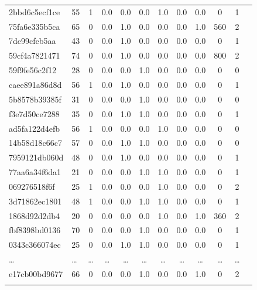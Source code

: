 \begin{landscape}
\begin{longtable}{p{3cm}lcccccccccc}
2bbd6c5ecf1ce & 55 & 1 & 0.0 & 0.0 & 0.0 & 1.0 & 0.0 & 0.0 & 0 & 1 \\
75fa6e335b5ca & 65 & 0 & 0.0 & 1.0 & 0.0 & 0.0 & 0.0 & 1.0 & 560 & 2 \\
7dc99cfcb5aa & 43 & 0 & 0.0 & 1.0 & 0.0 & 0.0 & 0.0 & 0.0 & 0 & 1 \\
59cf4a7821471 & 74 & 0 & 0.0 & 1.0 & 0.0 & 0.0 & 0.0 & 0.0 & 800 & 2 \\
59f9fe56c2f12 & 28 & 0 & 0.0 & 0.0 & 1.0 & 0.0 & 0.0 & 0.0 & 0 & 0 \\
caee891a86d8d & 56 & 1 & 0.0 & 1.0 & 0.0 & 0.0 & 0.0 & 0.0 & 0 & 1 \\
5b8578b39385f & 31 & 0 & 0.0 & 0.0 & 1.0 & 0.0 & 0.0 & 0.0 & 0 & 0 \\
f3e7d50ce7288 & 35 & 0 & 0.0 & 1.0 & 1.0 & 0.0 & 0.0 & 0.0 & 0 & 1 \\
ad5fa122d4efb & 56 & 1 & 0.0 & 0.0 & 0.0 & 1.0 & 0.0 & 0.0 & 0 & 0 \\
14b58d18c66c7 & 57 & 0 & 0.0 & 1.0 & 1.0 & 0.0 & 0.0 & 0.0 & 0 & 0 \\
7959121db060d & 48 & 0 & 0.0 & 1.0 & 0.0 & 0.0 & 0.0 & 0.0 & 0 & 1 \\
77aa6a34f6da1 & 21 & 0 & 0.0 & 0.0 & 1.0 & 1.0 & 0.0 & 0.0 & 0 & 1 \\
069276518f6f & 25 & 1 & 0.0 & 0.0 & 0.0 & 1.0 & 0.0 & 0.0 & 0 & 2 \\
3d71862ec1801 & 48 & 1 & 0.0 & 0.0 & 1.0 & 1.0 & 0.0 & 0.0 & 0 & 1 \\
1868d92d2db4 & 20 & 0 & 0.0 & 0.0 & 0.0 & 1.0 & 0.0 & 1.0 & 360 & 2 \\
fbf8398bd0136 & 70 & 0 & 0.0 & 0.0 & 1.0 & 0.0 & 0.0 & 0.0 & 0 & 1 \\
0343c366074ec & 25 & 0 & 0.0 & 1.0 & 1.0 & 0.0 & 0.0 & 0.0 & 0 & 1 \\ 
\dots & \dots & \dots & \dots & \dots & \dots & \dots & \dots & \dots & \dots & \dots \\ 
e17cb00bd9677 & 66 & 0 & 0.0 & 0.0 & 1.0 & 0.0 & 0.0 & 1.0 & 0 & 2 \\
\hline
\label{table:riwayat_pasien}
\end{longtable}
\end{landscape}


